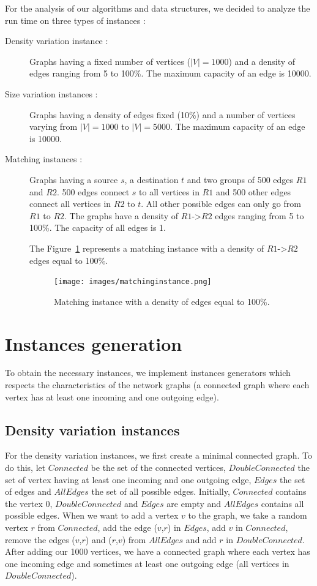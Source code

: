 
For the analysis of our algorithms and data structures, we decided to analyze the run time on three types of instances :
\begin{description}
\item[Density variation instance :]{Graphs having a fixed number of vertices ($|V|=1000$) and a density of edges ranging from 5 to 100\%. The maximum capacity of an edge is 10000.}
\item[Size variation instances :]{Graphs having a density of edges fixed (10\%) and a number of vertices varying from $|V|=1000$ to $|V|=5000$. The maximum capacity of an edge is 10000.}
\item[Matching instances :]{Graphs having a source $s$, a destination $t$ and two groups of 500 edges $R1$ and $R2$. 500 edges connect $s$ to all vertices in $R1$ and 500 other edges connect all vertices in $R2$ to $t$. All other possible edges can only go from $R1$ to $R2$. The graphs have a density of $R1$->$R2$ edges ranging from 5 to 100\%. The capacity of all edges is 1.

The Figure~\ref{fig:matching} represents a matching instance with a density of $R1$->$R2$ edges equal to 100\%.

\begin{figure}[H]
\begin{center}
\texttt{[image: images/matchinginstance.png]}
\caption{Matching instance with a density of edges equal to 100\%.}
\label{fig:matching}
\end{center}
\end{figure}}
\end{description} 

\section{Instances generation}
To obtain the necessary instances, we implement instances generators which respects the characteristics of the network graphs (a connected graph where each vertex has at least one incoming and one outgoing edge).

\subsection{Density variation instances}
For the density variation instances, we first create a minimal connected graph. To do this, let $Connected$ be the set of the connected vertices, $DoubleConnected$ the set of vertex having at least one incoming and one outgoing edge, $Edges$ the set of edges and $AllEdges$ the set of all possible edges. Initially, $Connected$ contains the vertex 0, $DoubleConnected$ and $Edges$ are empty and $AllEdges$ contains all possible edges. When we want to add a vertex $v$ to the graph, we take a random vertex $r$ from $Connected$, add the edge ($v$,$r$) in $Edges$, add $v$ in $Connected$, remove the edges ($v$,$r$) and ($r$,$v$) from $AllEdges$ and add $r$ in $DoubleConnected$. After adding our 1000 vertices, we have a connected graph where each vertex has one incoming edge and sometimes at least one outgoing edge (all vertices in $DoubleConnected$).

